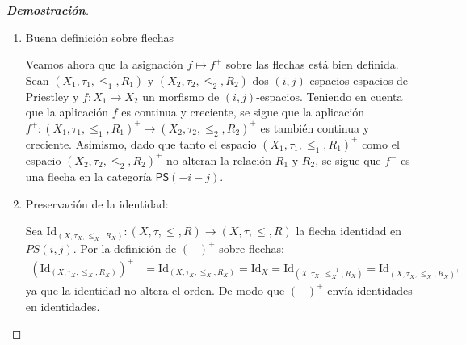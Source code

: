 \documentclass[12pt]{book}
\newcommand{\Id}{\mathrm{Id}}
\newcommand{\PS}{\mathsf{PS}}
\begin{document}
\begin{proof}[\textbf{Demostración}]
\begin{enumerate}
\begin{enumerate}
\item Veamos ahora que si $(x,y)\notin R $ entonces existe $  V\in D^{+}(X) $ tal que $ y\in V^{-i}$ y $R(x)\cap V^{-i}=\emptyset$. En efecto, comencemos asumiendo que  $(x,y)\notin R$. Dado que $R$ es una $(i,j)$-relación, tenemos que $\exists\, U\in \mathcal{D}(X)$ tal que  
$y\in U^i$ y $R(x)\cap U^i=\emptyset$. Consideremos $V=U^c$. Es claro que $V\in \mathcal{D}^{+}(X)$, $V^{-i}=U^{i}$  y se cumple que 
\begin{align*}
    y\in U^i=V^{-i} \text{ y } R(x)\cap U^{i}=R(x)\cap V^{-i}=\emptyset
\end{align*}
\end{enumerate}
Se concluye que $R$ es una \((-i,-j)\)-relación en el espacio $(X,\tau,\leq^{-1})$. Por lo tanto,
\begin{align*}
(X,\tau,\le,R)^{+}=(X,\tau,\leq^{-1},R)
\end{align*}
es un $(-i,-j)$-espacio de Priestley.

\medskip

\item Buena definición sobre flechas

Veamos ahora que la asignación $f \mapsto f^{+}$ sobre las flechas está bien definida. Sean $(X_{1},\tau_{1},\leq_{1},R_{1})$ y $(X_{2},\tau_{2},\leq_{2},R_{2})$ dos $(i,j)$-espacios espacios de Priestley y $f \colon X_{1} \to X_{2}$ un morfismo de $(i,j)$-espacios. Teniendo en cuenta que la aplicación $f$ es continua y creciente, se sigue que la aplicación $f^{+} \colon \left(X_{1},\tau_{1},\leq_{1},R_{1}\right)^{+} \to \left(X_{2},\tau_{2},\leq_{2},R_{2}\right)^{+}$ es también continua y creciente. Asimismo, dado que tanto el espacio $\left(X_{1},\tau_{1},\leq_{1},R_{1}\right)^{+}$ como el espacio $\left(X_{2},\tau_{2},\leq_{2},R_{2}\right)^{+}$ no alteran la relación $R_{1}$ y $R_{2}$, se sigue que $f^{+}$ es una flecha en la categoría $\PS(-i-j)$. 

\item Preservación de la identidad:

Sea $\Id_{(X, \tau_X, \leq_X, R_X)}\colon (X,\tau,\le,R)\to (X,\tau,\le,R)$ la flecha identidad en $PS(i,j)$. Por la definición de $(-)^{+}$ sobre flechas:
\begin{align*}
(\Id_{(X, \tau_X, \leq_X, R_X)})^{+} &= \Id_{(X, \tau_X, \leq_X, R_X)} = \Id_{X} = \Id_{(X,\tau_X,\le_X^{-1},R_X)} = \Id_{(X,\tau_X,\le_X,R_X)^{+}}
\end{align*}
ya que la identidad no altera el orden. De modo que $(-)^{+}$ envía identidades en identidades.


\end{enumerate}
\end{proof}
\end{document}
